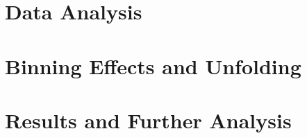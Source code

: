 \documentclass[12pt,oneside,vi]{mitthesis}
\begin{document}
\chapter{Data Analysis} \label{Chapter:BaseAnalysis}
    


\chapter{Binning Effects and Unfolding} \label{Chapter:Ch5_IBU}
    

\chapter{Results and Further Analysis} \label{Chapter:Further Analysis}
    

%



\printbibliography[heading=bibintoc]

\appendix

%
\end{document}
